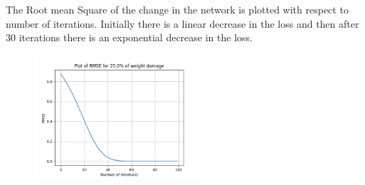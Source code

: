 \documentclass{article}
\begin{document}
\begin{figure}[H]
\hspace{0.001\textwidth}
\end{figure}


The Root mean Square of the change in the network is plotted with respect to number of iterations. Initially there is a linear decrease in the loss and then after 30 iterations there is an exponential decrease in the loss.
\begin{figure}[H]
\includegraphics[width=0.55\textwidth]{cat_12.png}
\centering
\end{figure}
\end{document}
